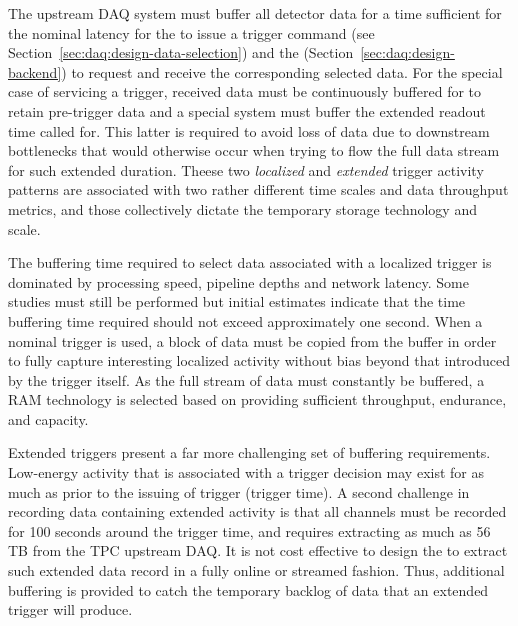 The upstream DAQ system must buffer all detector data for a time sufficient for
the nominal latency for the  to issue a trigger command (see
Section~\ref{sec:daq:design-data-selection}) and the 
(Section~\ref{sec:daq:design-backend}) to request and receive the corresponding
selected data. 
For the special case of servicing a  trigger, received data must be
continuously buffered for to retain pre-trigger data and a special system must
buffer the extended readout time called for. 
This latter is required to avoid loss of data due to downstream bottlenecks that
would otherwise occur when trying to flow the full data stream for such extended
duration.
Theese two \textit{localized} and \textit{extended} trigger activity patterns
are associated with two rather different time scales and data throughput
metrics, and those collectively dictate the temporary storage technology and
scale. 

The buffering time required to select data associated with a localized trigger
is dominated by processing speed, pipeline depths and network latency.
Some studies must still be performed but initial estimates indicate that the
time buffering time required should not exceed approximately one second. 
When a nominal trigger is used, a \dpreadout block of data must be copied from
the buffer in order to fully capture interesting localized activity without bias
beyond that introduced by the trigger itself.
As the full stream of data must constantly be buffered, a RAM technology is
selected based on providing sufficient throughput, endurance, and capacity. 

Extended triggers present a far more challenging set of buffering requirements.  
Low-energy activity that is associated with a  trigger decision may
exist for as much as \snbpretime prior to the issuing of  trigger
(trigger time).
A second challenge in recording data containing extended activity is that all
channels must be recorded for 100 seconds around the trigger time, and requires
extracting as much as 56 TB 
from the TPC upstream DAQ.
It is not cost effective to design the  to extract such extended data
record in a fully online or streamed fashion.
Thus, additional buffering is provided to catch the temporary backlog of data
that an extended trigger will produce.


